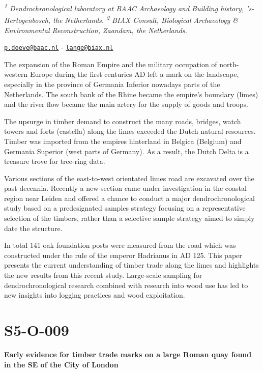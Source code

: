 \documentclass[
]{book}
\begin{document}
\emph{\textsuperscript{1} Dendrochronological laboratory at BAAC Archaeology and Building history, 's-Hertogenbosch, the Netherlands. \textsuperscript{2} BIAX Consult, Biological Archaeology \& Environmental Reconstruction, Zaandam, the Netherlands.}

\href{mailto:p.doeve@baac.nl}{\nolinkurl{p.doeve@baac.nl}} - \href{mailto:lange@biax.nl}{\nolinkurl{lange@biax.nl}}

The expansion of the Roman Empire and the military occupation of north-western Europe during the first centuries AD left a mark on the landscape, especially in the province of Germania Inferior nowadays parts of the Netherlands. The south bank of the Rhine became the empire's boundary (limes) and the river flow became the main artery for the supply of goods and troops.

The upsurge in timber demand to construct the many roads, bridges, watch towers and forts (castella) along the limes exceeded the Dutch natural resources. Timber was imported from the empires hinterland in Belgica (Belgium) and Germania Superior (west parts of Germany). As a result, the Dutch Delta is a treasure trove for tree-ring data.

Various sections of the east-to-west orientated limes road are excavated over the past decennia. Recently a new section came under investigation in the coastal region near Leiden and offered a chance to conduct a major dendrochronological study based on a predesignated samples strategy focusing on a representative selection of the timbers, rather than a selective sample strategy aimed to simply date the structure.

In total 141 oak foundation posts were measured from the road which was constructed under the rule of the emperor Hadrianus in AD 125. This paper presents the current understanding of timber trade along the limes and highlights the new results from this recent study. Large-scale sampling for dendrochronological research combined with research into wood use has led to new insights into logging practices and wood exploitation.

\hypertarget{s5-o-009}{%
\section*{S5-O-009}\label{s5-o-009}}

\textbf{Early evidence for timber trade marks on a large Roman quay found in the SE of the City of London}
\end{document}
